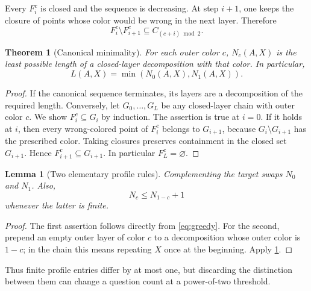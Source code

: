 \documentclass[11pt,letterpaper]{article}
\numberwithin{equation}{section}
\newtheorem{theorem}{Theorem}[section]
\newtheorem{lemma}[lemma]{Lemma}
\theoremstyle{definition}
\theoremstyle{remark}
\theoremstyle{definition}
\begin{document}
Every $F^c_i$ is closed and the sequence is decreasing. At step $i+1$, one keeps
the closure of points whose color would be wrong in the next layer. Therefore
\[
 F^c_i\setminus F^c_{i+1}\subseteq C_{(c+i)\bmod2}.
\]

\begin{theorem}[Canonical minimality]\label{thm:greedy}
For each outer color $c$, $N_c(A,X)$ is the least possible length of a
closed-layer decomposition with that color. In particular,
\begin{equation}\label{eq:profileformula}
 L(A,X)=\min(N_0(A,X),N_1(A,X)).
\end{equation}
\end{theorem}
\begin{proof}
If the canonical sequence terminates, its layers are a decomposition of the
required length. Conversely, let $G_0,\ldots,G_L$ be any closed-layer chain
with outer color $c$. We show $F^c_i\subseteq G_i$ by induction.
The assertion is true at $i=0$. If it holds at $i$, then every wrong-colored
point of $F^c_i$ belongs to $G_{i+1}$, because $G_i\setminus G_{i+1}$ has the
prescribed color. Taking closures preserves containment in the closed set
$G_{i+1}$. Hence $F^c_{i+1}\subseteq G_{i+1}$. In particular $F^c_L=\varnothing$.
\end{proof}

\begin{lemma}[Two elementary profile rules]\label{lem:profiles}
Complementing the target swaps $N_0$ and $N_1$. Also,
\[
 N_c\leq N_{1-c}+1
\]
whenever the latter is finite.
\end{lemma}
\begin{proof}
The first assertion follows directly from \eqref{eq:greedy}. For the second,
prepend an empty outer layer of color $c$ to a decomposition whose outer color
is $1-c$; in the chain this means repeating $X$ once at the beginning.
Apply \cref{thm:greedy}.
\end{proof}

Thus finite profile entries differ by at most one, but discarding the distinction
between them can change a question count at a power-of-two threshold.
\end{document}
